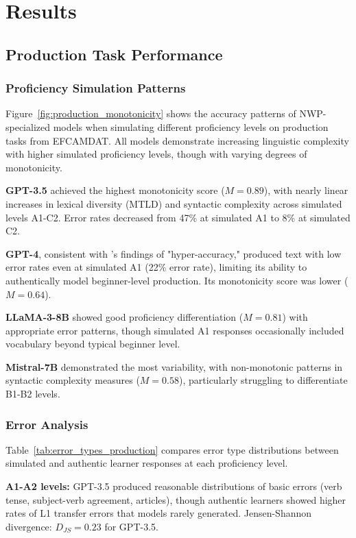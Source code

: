 \section{Results}

\subsection{Production Task Performance}

\subsubsection{Proficiency Simulation Patterns}

Figure~\ref{fig:production_monotonicity} shows the accuracy patterns of NWP-specialized models when simulating different proficiency levels on production tasks from EFCAMDAT. All models demonstrate increasing linguistic complexity with higher simulated proficiency levels, though with varying degrees of monotonicity.

\textbf{GPT-3.5} achieved the highest monotonicity score ($M = 0.89$), with nearly linear increases in lexical diversity (MTLD) and syntactic complexity across simulated levels A1-C2. Error rates decreased from 47\% at simulated A1 to 8\% at simulated C2.

\textbf{GPT-4}, consistent with \citet{benedetto2024using}'s findings of "hyper-accuracy," produced text with low error rates even at simulated A1 (22\% error rate), limiting its ability to authentically model beginner-level production. Its monotonicity score was lower ($M = 0.64$).

\textbf{LLaMA-3-8B} showed good proficiency differentiation ($M = 0.81$) with appropriate error patterns, though simulated A1 responses occasionally included vocabulary beyond typical beginner level.

\textbf{Mistral-7B} demonstrated the most variability, with non-monotonic patterns in syntactic complexity measures ($M = 0.58$), particularly struggling to differentiate B1-B2 levels.

\subsubsection{Error Analysis}

Table~\ref{tab:error_types_production} compares error type distributions between simulated and authentic learner responses at each proficiency level.

\textbf{A1-A2 levels:} GPT-3.5 produced reasonable distributions of basic errors (verb tense, subject-verb agreement, articles), though authentic learners showed higher rates of L1 transfer errors that models rarely generated. Jensen-Shannon divergence: $D_{JS} = 0.23$ for GPT-3.5.


